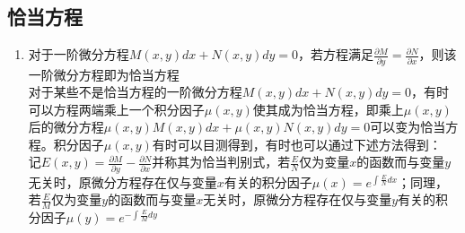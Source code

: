 \documentclass[12pt,a4paper,UTF8]{book}
\begin{document}
\subsection{恰当方程}
\begin{enumerate}
\item 对于一阶微分方程$M\left(x,y\right)dx+N\left(x,y\right)dy=0$，若方程满足$\frac{\partial M}{\partial y}=\frac{\partial N}{\partial x}$，则该一阶微分方程即为恰当方程\\
对于某些不是恰当方程的一阶微分方程$M\left(x,y\right)dx+N\left(x,y\right)dy=0$，有时可以方程两端乘上一个积分因子$\mu\left(x,y\right)$使其成为恰当方程，即乘上$\mu\left(x,y\right)$后的微分方程$\mu\left(x,y\right)M\left(x,y\right)dx+\mu\left(x,y\right)N\left(x,y\right)dy=0$可以变为恰当方程。积分因子$\mu\left(x,y\right)$有时可以目测得到，有时也可以通过下述方法得到：\\
记$E\left(x,y\right)=\frac{\partial M}{\partial y}-\frac{\partial N}{\partial x}$并称其为恰当判别式，若$\frac{E}{N}$仅为变量$x$的函数而与变量$y$无关时，原微分方程存在仅与变量$x$有关的积分因子$\mu\left(x\right)=e^{\int{\frac{E}{N}dx}}$；同理，若$\frac{E}{M}$仅为变量$y$的函数而与变量$x$无关时，原微分方程存在仅与变量$y$有关的积分因子$\mu\left(y\right)=e^{-\int{\frac{E}{M}dy}}$
\end{enumerate}
\end{document}
